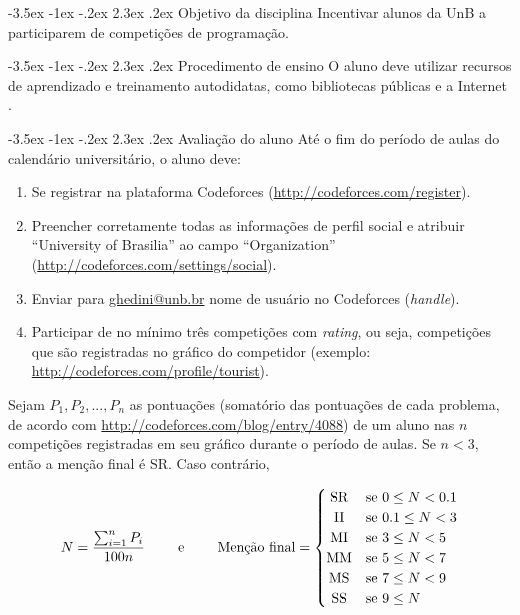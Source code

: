 \documentclass{UnBExam}%
\makeatletter
\renewcommand\section{\@startsection{section}{1}{\z@}%
	{-3.5ex \@plus -1ex \@minus -.2ex}%
	{2.3ex \@plus.2ex}%
	{\normalfont\normalsize\bfseries}}%
\renewcommand{\indent}{\hspace{.5cm}}
\makeatother
\begin{document}
	
\section{Objetivo da disciplina}
\indent Incentivar alunos da UnB a participarem de competições de programação.

\section{Procedimento de ensino}
\indent O aluno deve utilizar recursos de aprendizado e treinamento autodidatas, como bibliotecas públicas e a Internet \cite{halim2013competitive,cormen2009introduction,pimentaarticle}.

\section{Avaliação do aluno}
\indent Até o fim do período de aulas do calendário universitário, o aluno deve:
\begin{enumerate}
	\item Se registrar na plataforma Codeforces (\url{http://codeforces.com/register}).
	\item Preencher corretamente todas as informações de perfil social e atribuir ``University of Brasilia'' ao campo ``Organization'' (\url{http://codeforces.com/settings/social}).
	\item Enviar para \url{ghedini@unb.br} nome de usuário no Codeforces (\textit{handle}).
	\item Participar de no mínimo três competições com \textit{rating}, ou seja, competições que são registradas no gráfico do competidor (exemplo: \url{http://codeforces.com/profile/tourist}).
\end{enumerate}
\indent Sejam $P_1,P_2,...,P_n$ as pontuações (somatório das pontuações de cada problema, de acordo com \url{http://codeforces.com/blog/entry/4088}) de um aluno nas $n$ competições registradas em seu gráfico durante o período de aulas. Se $n < 3$, então a menção final é SR. Caso contrário,

\[
\begin{array}{ccc}
	N = \dfrac{\sum_{i=1}^{n} P_i}{100n} & \;\;\;\;\; \text{e} \;\;\;\;\; & 
	\text{Menção final} =
	\begin{cases}
	\hfill \text{SR} \hfill & \text{se } 0 \leq N < 0.1 \\
	\hfill \text{II} \hfill & \text{se } 0.1 \leq N < 3 \\
	\hfill \text{MI} \hfill & \text{se } 3 \leq N < 5 \\
	\hfill \text{MM} \hfill & \text{se } 5 \leq N < 7 \\
	\hfill \text{MS} \hfill & \text{se } 7 \leq N < 9 \\
	\hfill \text{SS} \hfill & \text{se } 9 \leq N \\
	\end{cases}
\end{array}
\]
\end{document}
